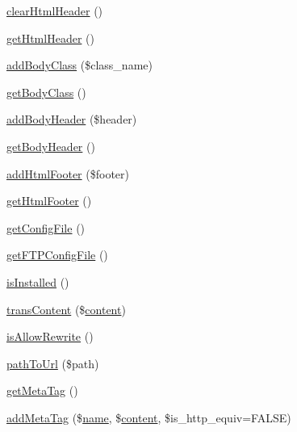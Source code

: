 \begin{DoxyCompactItemize}
\hyperlink{classContext_a5f0332b30b4ad65c0374ebd848c1dd98}{clear\+Html\+Header} ()
\item 
\hyperlink{classContext_a302e4b5d868e7a5c8bee216f774ca244}{get\+Html\+Header} ()
\item 
\hyperlink{classContext_ad266c6556167746e9368c4b1a7f6b16b}{add\+Body\+Class} (\$class\+\_\+name)
\item 
\hyperlink{classContext_a6562a2a894b2142362640e512bcf4e09}{get\+Body\+Class} ()
\item 
\hyperlink{classContext_ae7c9dad9ccd3e410283e21c67f395114}{add\+Body\+Header} (\$header)
\item 
\hyperlink{classContext_a991c9fc6985b78d817b6771092913975}{get\+Body\+Header} ()
\item 
\hyperlink{classContext_aa81925b1cc7e991c1c798e739fe048a4}{add\+Html\+Footer} (\$footer)
\item 
\hyperlink{classContext_ae7bb6879f84366eea76da3a7bf6a40bd}{get\+Html\+Footer} ()
\item 
\hyperlink{classContext_a7ac0928e07cfc7f19f9a7341c50b4811}{get\+Config\+File} ()
\item 
\hyperlink{classContext_ab7bb799f55be29174c8a15659dab823a}{get\+F\+T\+P\+Config\+File} ()
\item 
\hyperlink{classContext_a5a8714e3a0f9d4722a31ce73017c6613}{is\+Installed} ()
\item 
\hyperlink{classContext_a4767b003bd726a994b1bf6bf68a3bb7e}{trans\+Content} (\$\hyperlink{classcontent}{content})
\item 
\hyperlink{classContext_aa11482b69f0892e9e8013e08c9914ff4}{is\+Allow\+Rewrite} ()
\item 
\hyperlink{classContext_a6012ceb6e62fc99b0e2b24e475ba4da7}{path\+To\+Url} (\$path)
\item 
\hyperlink{classContext_a8ee4ad4396e92a54d2aa7d079771619f}{get\+Meta\+Tag} ()
\item 
\hyperlink{classContext_aeae29df3bedc1f90a497d34543a08f7f}{add\+Meta\+Tag} (\$\hyperlink{common_8js_a22c29d2aa8ed6161ce8faa718ef76e68}{name}, \$\hyperlink{classcontent}{content}, \$is\+\_\+http\+\_\+equiv=F\+A\+L\+SE)
\end{DoxyCompactItemize}
